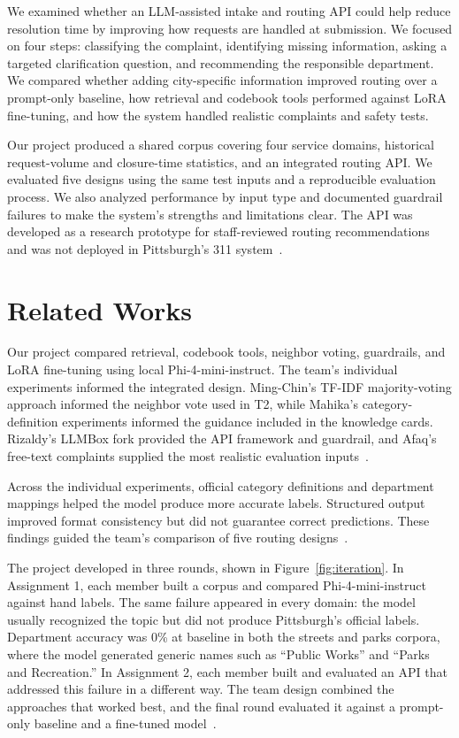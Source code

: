 \documentclass[11pt,letterpaper]{article}
\begin{document}
We examined whether an LLM-assisted intake and routing API could help reduce resolution time by improving how requests are handled at submission. We focused on four steps: classifying the complaint, identifying missing information, asking a targeted clarification question, and recommending the responsible department. We compared whether adding city-specific information improved routing over a prompt-only baseline, how retrieval and codebook tools performed against LoRA fine-tuning, and how the system handled realistic complaints and safety tests.

Our project produced a shared corpus covering four service domains, historical request-volume and closure-time statistics, and an integrated routing API. We evaluated five designs using the same test inputs and a reproducible evaluation process. We also analyzed performance by input type and documented guardrail failures to make the system's strengths and limitations clear. The API was developed as a research prototype for staff-reviewed routing recommendations and was not deployed in Pittsburgh's 311 system~\cite{team}.

\section{Related Works}

Our project compared retrieval, codebook tools, neighbor voting, guardrails, and LoRA fine-tuning using local Phi-4-mini-instruct. The team's individual experiments informed the integrated design. Ming-Chin's TF-IDF majority-voting approach informed the neighbor vote used in T2, while Mahika's category-definition experiments informed the guidance included in the knowledge cards. Rizaldy's LLMBox fork provided the API framework and guardrail, and Afaq's free-text complaints supplied the most realistic evaluation inputs~\cite{team}.

Across the individual experiments, official category definitions and department mappings helped the model produce more accurate labels. Structured output improved format consistency but did not guarantee correct predictions. These findings guided the team's comparison of five routing designs~\cite{team}.

The project developed in three rounds, shown in Figure~\ref{fig:iteration}. In Assignment 1, each member built a corpus and compared Phi-4-mini-instruct~\cite{phi4mini} against hand labels. The same failure appeared in every domain: the model usually recognized the topic but did not produce Pittsburgh's official labels. Department accuracy was 0\% at baseline in both the streets and parks corpora, where the model generated generic names such as ``Public Works'' and ``Parks and Recreation.'' In Assignment 2, each member built and evaluated an API that addressed this failure in a different way. The team design combined the approaches that worked best, and the final round evaluated it against a prompt-only baseline and a fine-tuned model~\cite{team}.
\end{document}
